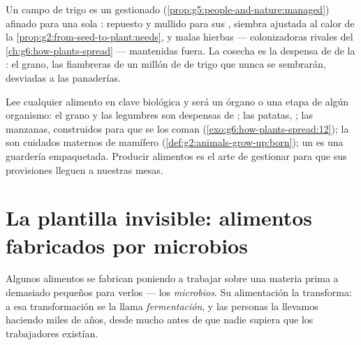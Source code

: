 \begin{example}\label{ex:g6:producing-our-food:wheat}
Un campo de trigo es un  gestionado
(\cref{prop:g5:people-and-nature:managed}) afinado para una sola
:  repuesto y mullido para sus , siembra ajustada
al calor de la \cref{prop:g2:from-seed-to-plant:needs}, y malas hierbas
--- colonizadoras rivales del \cref{ch:g6:how-plants-spread} ---
mantenidas fuera. La cosecha es la despensa de  de la :
el grano, las fiambreras de un millón de  de trigo que nunca se
sembrarán, desviadas a las panaderías.
\end{example}

\begin{remark}\label{rem:g6:producing-our-food:stage}
Lee cualquier alimento en clave biológica y será un órgano o una etapa
de algún organismo: el grano y las legumbres son despensas de ;
las patatas, ; las manzanas,  construidos para que se
los coman (\cref{exo:g6:how-plants-spread:12}); la  son cuidados
maternos de mamífero (\cref{def:g2:animals-grow-up:born}); un  es
una guardería empaquetada. Producir alimentos es el arte de gestionar
 para que sus provisiones lleguen a nuestras mesas.
\end{remark}

\section{La plantilla invisible: alimentos fabricados por microbios}

\begin{definition}[Fermentación]\label{def:g6:producing-our-food:fermentation}
Algunos alimentos se fabrican poniendo a trabajar sobre una materia
prima a  demasiado pequeños para verlos --- los
\emph{microbios}. Su alimentación la
transforma: a esa transformación se la llama
\emph{fermentación}, y las personas la llevamos
haciendo miles de años, desde mucho antes de que nadie supiera que los
trabajadores existían.
\end{definition}

